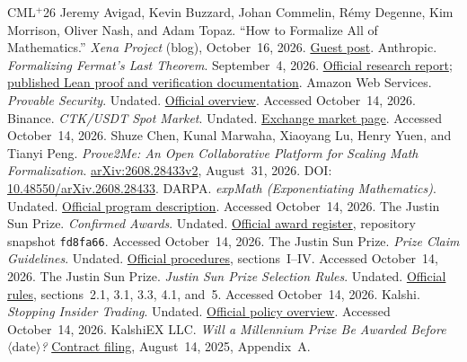 \documentclass[11pt,a4paper,reqno]{amsart}
\numberwithin{equation}{section}
\begin{document}
\begin{thebibliography}{CML$^{+}$26}
\setlength{\itemsep}{3pt}
 Jeremy Avigad, Kevin Buzzard, Johan Commelin, R\'emy Degenne, Kim Morrison, Oliver Nash, and Adam Topaz. ``How to Formalize All of Mathematics.'' \emph{Xena Project} (blog), October~16, 2026. \href{https://xenaproject.wordpress.com/2026/10/16/how-to-formalize-all-of-mathematics/}{Guest post}.
 Anthropic. \emph{Formalizing Fermat's Last Theorem}. September~4, 2026. \href{https://www.anthropic.com/news/formalizing-fermats-last-theorem}{Official research report}; \href{https://github.com/anthropics/fermats-last-theorem}{published Lean proof and verification documentation}.
 Amazon Web Services. \emph{Provable Security}. Undated. \href{https://aws.amazon.com/security/provable-security/}{Official overview}. Accessed October~14, 2026.
 Binance. \emph{CTK/USDT Spot Market}. Undated. \href{https://www.binance.com/en/trade/CTK_USDT?type=spot}{Exchange market page}. Accessed October~14, 2026.
 Shuze Chen, Kunal Marwaha, Xiaoyang Lu, Henry Yuen, and Tianyi Peng. \emph{Prove2Me: An Open Collaborative Platform for Scaling Math Formalization}. \href{https://arxiv.org/abs/2608.28433v2}{arXiv:2608.28433v2}, August~31, 2026. DOI: \href{https://doi.org/10.48550/arXiv.2608.28433}{10.48550/arXiv.2608.28433}.
 DARPA. \emph{expMath (Exponentiating Mathematics)}. Undated. \href{https://www.darpa.mil/research/programs/expmath-exponential-mathematics}{Official program description}. Accessed October~14, 2026.
 The Justin Sun Prize. \emph{Confirmed Awards}. Undated. \href{https://github.com/TheJustinSunPrize/awards/blob/fd8fa66abb4e21df828fdebc25298e9ad75521bd/awards/README.md}{Official award register}, repository snapshot \texttt{fd8fa66}. Accessed October~14, 2026.
 The Justin Sun Prize. \emph{Prize Claim Guidelines}. Undated. \href{https://www.hejustinsun.com/prize/claim}{Official procedures}, sections~I--IV. Accessed October~14, 2026.
 The Justin Sun Prize. \emph{Justin Sun Prize Selection Rules}. Undated. \href{https://www.hejustinsun.com/prize/rules}{Official rules}, sections~2.1, 3.1, 3.3, 4.1, and~5. Accessed October~14, 2026.
 Kalshi. \emph{Stopping Insider Trading}. Undated. \href{https://kalshi.com/policy-center/insider-trading}{Official policy overview}. Accessed October~14, 2026.
 KalshiEX LLC. \emph{Will a Millennium Prize Be Awarded Before $\langle\mathrm{date}\rangle$?} \href{https://www.cftc.gov/filings/ptc/ptc08142528943.pdf}{Contract filing}, August~14, 2025, Appendix~A.

\end{thebibliography}
\end{document}
